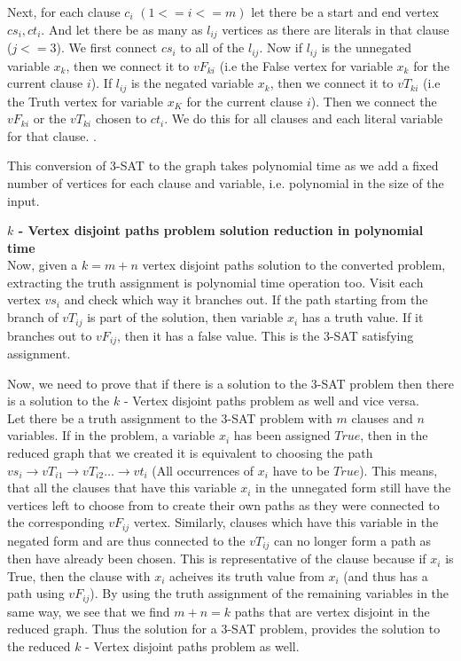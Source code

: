 \documentclass{imports}
\begin{document}
    Next, for each clause $c_i$ $(1<=i<=m)$ let there be a start and end vertex $cs_i, ct_i$. And let there be as many as $l_{ij}$ vertices as 
    there are literals in that clause ($j<=3$). We first connect $cs_i$ to all of the $l_{ij}$. Now if $l_{ij}$ is the unnegated variable
    $x_k$, then we connect it to $vF_{ki}$ (i.e the False vertex for variable $x_k$ for the current clause $i$). If $l_{ij}$ is the negated
    variable $x_k$, then we connect it to $vT_{ki}$ (i.e the Truth vertex for variable $x_K$ for the current clause $i$). Then we connect 
    the $vF_{ki}$ or the $vT_{ki}$ chosen to $ct_i$. We do this for all clauses and each literal variable for that clause.
    \vspace{10pt}.

    This conversion of 3-SAT to the graph takes polynomial time as we add a fixed number of vertices for each clause and variable,
    i.e. polynomial in the size of the input. \vspace{10pt}

    \textbf{$k$ - Vertex disjoint paths problem solution reduction in polynomial time}\\

    Now, given a $k = m+n$ vertex disjoint paths solution to the converted problem, extracting the truth assignment is polynomial time
    operation too. Visit each vertex $vs_i$ and check which way it branches out. If the path starting from the branch of $vT_{ij}$ is part of the solution, then variable $x_i$ has a truth value. If it branches out to $vF_{ij}$, then it has a false value. This is the 3-SAT satisfying assignment.
    \vspace{10pt}

    Now, we need to prove that if there is a solution to the 3-SAT problem then there is a solution to the $k$ - Vertex disjoint paths problem as well and vice versa.\\

    Let there be a truth assignment to the 3-SAT problem with $m$ clauses and $n$ variables. If in the problem, a variable $x_i$ has been assigned $True$, then in the reduced graph that we created it is equivalent to choosing the path $vs_i \to vT_{i1} \to  vT_{i2} \dots \to vt_i$ (All occurrences of $x_i$ have to be $True$). This means, that all the clauses that have this variable $x_i$ in the unnegated form still have the vertices left to choose from to create their own paths as they were connected to the corresponding $vF_{ij}$ vertex. Similarly, clauses which have this variable in the negated form and are thus connected to the $vT_{ij}$ can no longer form a  path as then have already been chosen. This is representative of the clause because if $x_i$ is True, then the clause with $x_i$ acheives its truth value from $x_i$ (and thus has a path using $vF_{ij}$). By using the truth assignment of the remaining variables in the same way, we see that we find $m+n=k$ paths that are vertex disjoint in the reduced graph. Thus the solution for a 3-SAT problem, provides the solution to the reduced $k$ - Vertex disjoint paths problem as well. \vspace{10pt}
\end{document}
